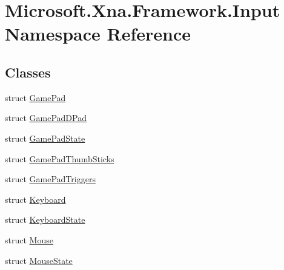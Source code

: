 \hypertarget{namespaceMicrosoft_1_1Xna_1_1Framework_1_1Input}{}\section{Microsoft.\+Xna.\+Framework.\+Input Namespace Reference}
\label{namespaceMicrosoft_1_1Xna_1_1Framework_1_1Input}
\subsection*{Classes}
\begin{DoxyCompactItemize}
\item 
struct \hyperlink{structMicrosoft_1_1Xna_1_1Framework_1_1Input_1_1GamePad}{Game\+Pad}
\item 
struct \hyperlink{structMicrosoft_1_1Xna_1_1Framework_1_1Input_1_1GamePadDPad}{Game\+Pad\+D\+Pad}
\item 
struct \hyperlink{structMicrosoft_1_1Xna_1_1Framework_1_1Input_1_1GamePadState}{Game\+Pad\+State}
\item 
struct \hyperlink{structMicrosoft_1_1Xna_1_1Framework_1_1Input_1_1GamePadThumbSticks}{Game\+Pad\+Thumb\+Sticks}
\item 
struct \hyperlink{structMicrosoft_1_1Xna_1_1Framework_1_1Input_1_1GamePadTriggers}{Game\+Pad\+Triggers}
\item 
struct \hyperlink{structMicrosoft_1_1Xna_1_1Framework_1_1Input_1_1Keyboard}{Keyboard}
\item 
struct \hyperlink{structMicrosoft_1_1Xna_1_1Framework_1_1Input_1_1KeyboardState}{Keyboard\+State}
\item 
struct \hyperlink{structMicrosoft_1_1Xna_1_1Framework_1_1Input_1_1Mouse}{Mouse}
\item 
struct \hyperlink{structMicrosoft_1_1Xna_1_1Framework_1_1Input_1_1MouseState}{Mouse\+State}
\end{DoxyCompactItemize}

